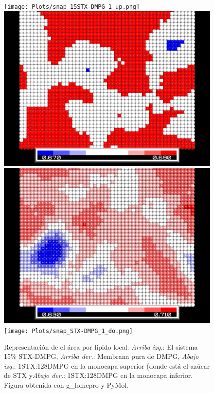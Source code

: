 \begin{figure}
\begin{center}
    \texttt{[image: Plots/snap\_15STX-DMPG\_1\_up.png]}
    \includegraphics[scale=0.04]{Plots/snap_MEM-DMPG_1_up.png}
    \includegraphics[scale=0.04]{Plots/snap_STX-DMPG_1_up.png}
        \texttt{[image: Plots/snap\_STX-DMPG\_1\_do.png]}
  \caption{Representaci\'{o}n de el \'{a}rea por l\'{i}pido local. \textit{Arriba izq.}: El sistema 15\% STX-DMPG, \textit{Arriba der.}: Membrana pura de DMPG, \textit{Abajo izq.}: 1STX:128DMPG en la monocapa superior (donde est\'{a} el az\'{u}car de STX y\textit{Abajo der.}: 1STX:128DMPG en la monocapa inferior. Figura obtenida con g\_lomepro y PyMol.}
  \label{fig:aplsnap}
\end{center}
\end{figure}
